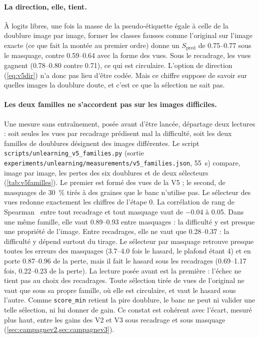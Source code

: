 \documentclass[11pt,a4paper]{article}
\newcommand{\code}[1]{\texttt{#1}}
\newcommand{\chemin}[1]{\nolinkurl{#1}}%
\begin{document}
\paragraph{La direction, elle, tient.} À logits libres, une fois la masse de la pseudo-étiquette
égale à celle de la doublure image par image, former les classes fausses comme l'original sur l'image
exacte (ce que fait la montée au premier ordre) donne un $S_{\text{pred}}$ de \numrange{0.75}{0.77}
sous le masquage, contre \numrange{0.59}{0.64} avec la forme des vues. Sous le recadrage, les vues
gagnent (\numrange{0.78}{0.80} contre \num{0.71}), ce qui est circulaire. L'option de
direction (\cref{eq:v5dir}) n'a donc pas lieu d'être codée. Mais ce chiffre suppose de savoir sur
quelles images la doublure doute, et c'est ce que la sélection ne sait pas.

\paragraph{Les deux familles ne s'accordent pas sur les images difficiles.} Une mesure sans
entraînement, posée avant d'être lancée, départage deux lectures : soit seules les vues par
recadrage prédisent mal la difficulté, soit les deux familles de doublures désignent des images
différentes. Le script \chemin{scripts/unlearning_v5_families.py} (sortie
\chemin{experiments/unlearning/measurements/v5_families.json}, \SI{55}{\second}) compare, image par
image, les pertes des six doublures et de deux sélecteurs (\cref{tab:v5familles}). Le premier est
formé des vues de la V5 ; le second, de masquages de \SI{30}{\percent} tirés à des graines que le banc
n'utilise pas. Le sélecteur des vues redonne exactement les chiffres de l'étape 0. La corrélation de
rang de Spearman~\cite{spearman1904} entre tout recadrage et tout masquage vaut de \num{-0.04} à
\num{+0.05}. Dans une même famille, elle vaut \numrange{0.89}{0.93} entre masquages : la difficulté y
est presque une propriété de l'image. Entre recadrages, elle ne vaut que \numrange{0.28}{0.37} : la
difficulté y dépend surtout du tirage. Le sélecteur par masquage retrouve presque toutes les erreurs
des masquages (\numrange{3.7}{4.0} fois le hasard, le plafond étant 4) et en porte
\numrange{0.87}{0.96} de la perte, mais il fait le hasard sous les recadrages (\numrange{0.69}{1.17}
fois, \numrange{0.22}{0.23} de la perte). La lecture posée avant est la première : l'échec ne tient
pas au choix des recadrages. Toute sélection tirée de vues de l'original ne vaut que sous sa propre
famille, où elle est circulaire, et vaut le hasard sous l'autre. Comme \code{score\_min} retient la
pire doublure, le banc ne peut ni valider une telle sélection, ni lui donner de gain. Ce constat est
cohérent avec l'écart, mesuré plus haut, entre les gains des V2 et V3 sous recadrage et sous masquage
(\cref{sec:campagnev2,sec:campagnev3}).
\end{document}

